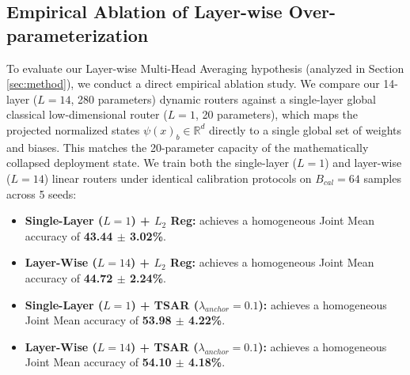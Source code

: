 \subsection{Empirical Ablation of Layer-wise Over-parameterization}
To evaluate our Layer-wise Multi-Head Averaging hypothesis (analyzed in Section \ref{sec:method}),
we conduct a direct empirical ablation study. We compare our 14-layer ($L=14$, 280 parameters)
dynamic routers against a single-layer global classical low-dimensional router ($L=1$, 20
parameters), which maps the projected normalized states $\psi(x)_b \in \mathbb{R}^d$ directly to a
single global set of weights and biases. This matches the 20-parameter capacity of the
mathematically collapsed deployment state. We train both the single-layer ($L=1$) and layer-wise
($L=14$) linear routers under identical calibration protocols on $B_{cal}=64$ samples across 5
seeds:
\begin{itemize}
  \item \textbf{Single-Layer ($L=1$) + $L_2$ Reg:} achieves a homogeneous Joint Mean accuracy of
\textbf{43.44 $\pm$ 3.02\%}.
  \item \textbf{Layer-Wise ($L=14$) + $L_2$ Reg:} achieves a homogeneous Joint Mean accuracy of
\textbf{44.72 $\pm$ 2.24\%}.
  \item \textbf{Single-Layer ($L=1$) + TSAR ($\lambda_{anchor}=0.1$):} achieves a homogeneous Joint
Mean accuracy of \textbf{53.98 $\pm$ 4.22\%}.
  \item \textbf{Layer-Wise ($L=14$) + TSAR ($\lambda_{anchor}=0.1$):} achieves a homogeneous Joint
Mean accuracy of \textbf{54.10 $\pm$ 4.18\%}.
\end{itemize}

